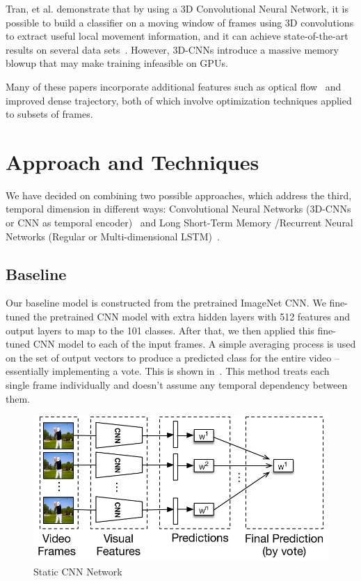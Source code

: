 Tran, et al. demonstrate that by using a 3D Convolutional Neural Network, it is possible to build a classifier on a moving window of frames using 3D convolutions to extract useful local movement information, and it can achieve state-of-the-art results on several data sets~\cite{stf}. However, 3D-CNNs introduce a massive memory blowup that may make training infeasible on GPUs.

Many of these papers incorporate additional features such as optical flow~\cite{brox} and improved dense trajectory, both of which involve optimization techniques applied to subsets of frames. 

\section{Approach and Techniques}
We have decided on combining two possible approaches, which address
the third, temporal dimension in different ways: Convolutional Neural
Networks (3D-CNNs or CNN as temporal encoder)~\cite{stf,cnnvid,cnnMNLS} and Long
Short-Term Memory /Recurrent Neural Networks (Regular or Multi-dimensional LSTM)~\cite{ltrcn}. 

\subsection{Baseline}
Our baseline model is constructed from the pretrained ImageNet CNN. We fine-tuned the pretrained CNN model with extra hidden layers with 512 features and output layers to map to the 101 classes. After that, we then applied this fine-tuned CNN model to each of the input frames. A simple averaging process is used on the set of output vectors to produce a predicted class for the entire video -- essentially implementing a vote. This is shown in~. This method treats each single frame individually and doesn't assume any temporal dependency between them. 
\begin{figure}
  \centering
  \includegraphics[width=1.0\linewidth]{figs/cnn}
  \caption{Static CNN Network}
  \label{fig:cnn}
\end{figure}

